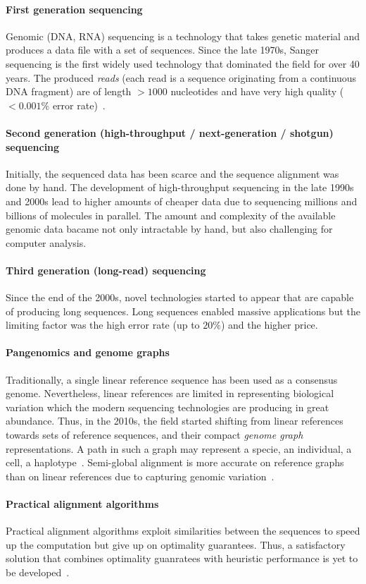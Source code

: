 \paragraph{First generation sequencing}
Genomic (DNA, RNA) sequencing is a technology that takes genetic material and
produces a data file with a set of sequences. Since the late 1970s, Sanger
sequencing is the first widely used technology that dominated the field for over
40 years. The produced \emph{reads} (each read is a sequence originating from a
continuous DNA fragment) are of length ${>}1000$ nucleotides and have very high
quality (${<}0.001\%$ error rate)~\citep{shendure2008next}.

\paragraph{Second generation (high-throughput / next-generation / shotgun) sequencing}
Initially, the sequenced data has been scarce and the sequence alignment was
done by hand. The development of high-throughput sequencing in the late 1990s
and 2000s lead to higher amounts of cheaper data due to sequencing millions and
billions of molecules in parallel. The amount and complexity of the available
genomic data bacame not only intractable by hand, but also challenging for
computer analysis.

\paragraph{Third generation (long-read) sequencing}
Since the end of the 2000s, novel technologies started to appear that are
capable of producing long sequences. Long sequences enabled massive applications
but the limiting factor was the high error rate (up to $20\%$) and the higher
price.

\paragraph{Pangenomics and genome graphs}
Traditionally, a single linear reference sequence has been used as a consensus
genome. Nevertheless, linear references are limited in representing biological
variation which the modern sequencing technologies are producing in great
abundance. Thus, in the 2010s, the field started shifting from linear references
towards sets of reference sequences, and their compact \emph{genome graph}
representations. A path in such a graph may represent a specie, an individual, a
cell, a haplotype~\cite{dilthey_improved_2015,paten_genome_2017}. Semi-global
alignment is more accurate on reference graphs than on linear references due to
capturing genomic variation~\citep{garrison_variation_2018}.

\paragraph{Practical alignment algorithms}
Practical alignment algorithms exploit similarities between the sequences to
speed up the computation but give up on optimality guarantees. Thus, a
satisfactory solution that combines optimality guanratees with heuristic
performance is yet to be developed~\citep{medvedev2022theoretical}.
